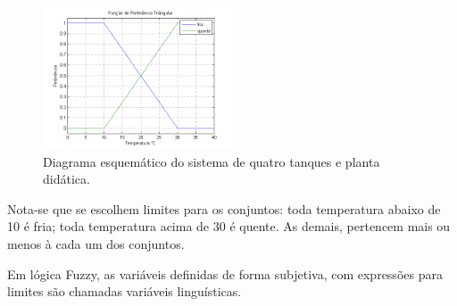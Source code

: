 \begin{figure}[H]
	\includegraphics[width=0.5\textwidth]{img/pertinencia.png}
	\caption{Diagrama esquemático do sistema de quatro tanques e planta didática.}
	\label{figPertinencia}
\end{figure}

Nota-se que se escolhem limites para os conjuntos: toda temperatura abaixo de 10 é fria; toda temperatura acima de 30 é quente. As demais, pertencem mais ou menos à cada um dos conjuntos.

Em lógica Fuzzy, as variáveis definidas de forma subjetiva, com expressões para limites são chamadas variáveis linguísticas.




%

